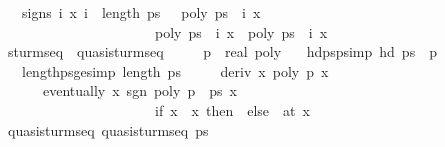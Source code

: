 \begin{isabellebody}
\ \ \ signs{\isacharcolon}\ {\isachardoublequoteopen}{\isasymAnd}i\ x{\isachardot}\ {\isasymlbrakk}i\ {\isacharless}\ length\ ps\ {\isacharminus}\ {}{\isacharsemicolon}\ poly\ {\isacharparenleft}ps\ {\isacharbang}\ {\isacharparenleft}i{\isacharplus}{}{\isacharparenright}{\isacharparenright}\ x\ {\isacharequal}\ {}{\isasymrbrakk}\isanewline
\ \ \ \ \ \ \ \ \ \ \ \ \ \ \ \ \ \ \ \ \ {\isasymLongrightarrow}\ {\isacharparenleft}poly\ {\isacharparenleft}ps\ {\isacharbang}\ {\isacharparenleft}i{\isacharplus}{}{\isacharparenright}{\isacharparenright}\ x{\isacharparenright}\ {\isacharasterisk}\ {\isacharparenleft}poly\ {\isacharparenleft}ps\ {\isacharbang}\ i{\isacharparenright}\ x{\isacharparenright}\ {\isacharless}\ {}{\isachardoublequoteclose}\isanewline
\isanewline
{}\isamarkupfalse%
\ sturm{\isacharunderscore}seq\ {\isacharequal}\ quasi{\isacharunderscore}sturm{\isacharunderscore}seq\ {\isacharplus}\ \isanewline
\ \ \ p\ {\isacharcolon}{\isacharcolon}\ {\isachardoublequoteopen}real\ poly{\isachardoublequoteclose}\isanewline
\ \ \ hd{\isacharunderscore}ps{\isacharunderscore}p{\isacharbrackleft}simp{\isacharbrackright}{\isacharcolon}\ {\isachardoublequoteopen}hd\ ps\ {\isacharequal}\ p{\isachardoublequoteclose}\isanewline
\ \ \ length{\isacharunderscore}ps{\isacharunderscore}ge{\isacharunderscore}{}{\isacharbrackleft}simp{\isacharbrackright}{\isacharcolon}\ {\isachardoublequoteopen}length\ ps\ {\isasymge}\ {}{\isachardoublequoteclose}\isanewline
\ \ \ deriv{\isacharcolon}\ {\isachardoublequoteopen}{\isasymAnd}x\ poly\ p\ x\ {\isacharequal}\ {}\ {\isasymLongrightarrow}\ \isanewline
\ \ \ \ \ \ eventually\ {\isacharparenleft}{\isasymlambda}x{\isachardot}\ sgn\ {\isacharparenleft}poly\ {\isacharparenleft}p\ {\isacharasterisk}\ ps{\isacharbang}{}{\isacharparenright}\ x{\isacharparenright}\ {\isacharequal}\ \isanewline
\ \ \ \ \ \ \ \ \ \ \ \ \ \ \ \ \ \ \ \ \ \ {\isacharparenleft}if\ x\ {\isachargreater}\ x\ then\ {}\ else\ {\isacharminus}{}{\isacharparenright}{\isacharparenright}\ {\isacharparenleft}at\ x\isanewline
{}\isanewline
\isanewline
\ \ \isamarkupfalse%
\ quasi{\isacharunderscore}sturm{\isacharunderscore}seq{\isacharcolon}\ {\isachardoublequoteopen}quasi{\isacharunderscore}sturm{\isacharunderscore}seq\ ps{\isachardoublequoteclose}%

\end{isabellebody}
